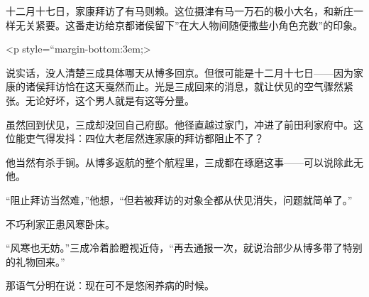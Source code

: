 \documentclass[
]{book}
\begin{document}
十二月十七日，家康拜访了有马则赖。这位摄津有马一万石的极小大名，和新庄一样无关紧要。这番走访给京都诸侯留下''在大人物间随便撒些小角色充数''的印象。

\textless p style=``margin-bottom:3em;\textgreater{}

说实话，没人清楚三成具体哪天从博多回京。但很可能是十二月十七日------因为家康的诸侯拜访恰在这天戛然而止。光是三成回来的消息，就让伏见的空气骤然紧张。无论好坏，这个男人就是有这等分量。

虽然回到伏见，三成却没回自己府邸。他径直越过家门，冲进了前田利家府中。这位能吏气得发抖：四位大老居然连家康的拜访都阻止不了？

他当然有杀手锏。从博多返航的整个航程里，三成都在琢磨这事------可以说除此无他。

``阻止拜访当然难，''他想，``但若被拜访的对象全都从伏见消失，问题就简单了。''

不巧利家正患风寒卧床。

``风寒也无妨。''三成冷着脸瞪视近侍，``再去通报一次，就说治部少从博多带了特别的礼物回来。''

那语气分明在说：现在可不是悠闲养病的时候。

\printbibliography
\end{document}
